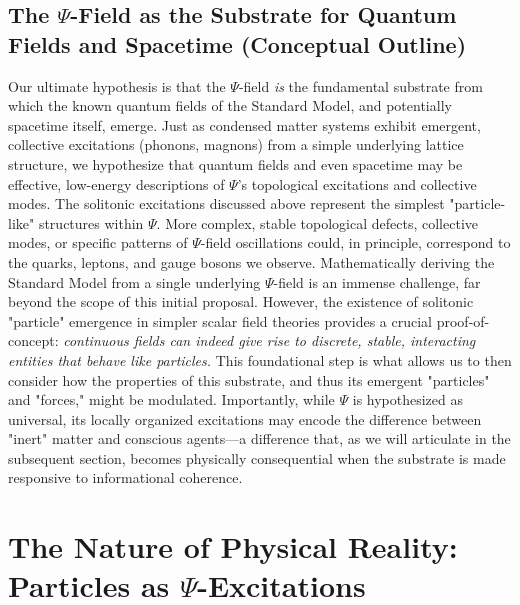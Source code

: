 \documentclass[11pt, a4paper]{book}
\begin{document}
\subsection{The $\Psi$-Field as the Substrate for Quantum Fields and Spacetime (Conceptual Outline)}
\label{ssec:psisubstrate_qftemergence_mainpaper}
Our ultimate hypothesis is that the $\Psi$-field \emph{is} the fundamental substrate from which the known quantum fields of the Standard Model, and potentially spacetime itself, emerge. Just as condensed matter systems exhibit emergent, collective excitations (phonons, magnons) from a simple underlying lattice structure, we hypothesize that quantum fields and even spacetime may be effective, low-energy descriptions of $\Psi$’s topological excitations and collective modes. The solitonic excitations discussed above represent the simplest "particle-like" structures within $\Psi$. More complex, stable topological defects, collective modes, or specific patterns of $\Psi$-field oscillations could, in principle, correspond to the quarks, leptons, and gauge bosons we observe. Mathematically deriving the Standard Model from a single underlying $\Psi$-field is an immense challenge, far beyond the scope of this initial proposal. However, the existence of solitonic "particle" emergence in simpler scalar field theories provides a crucial proof-of-concept: \emph{continuous fields can indeed give rise to discrete, stable, interacting entities that behave like particles.} This foundational step is what allows us to then consider how the properties of this substrate, and thus its emergent "particles" and "forces," might be modulated. Importantly, while $\Psi$ is hypothesized as universal, its locally organized excitations may encode the difference between "inert" matter and conscious agents—a difference that, as we will articulate in the subsequent section, becomes physically consequential when the substrate is made responsive to informational coherence.

\section{The Nature of Physical Reality: Particles as $\Psi$-Excitations} %
\label{sec:particlesaspsi_mainpaper}
\end{document}
